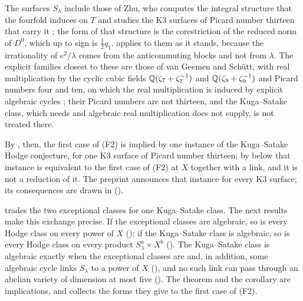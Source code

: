 \begin{remark}
The surfaces $S_{\lambda}$ include those of Zhu, who computes the integral
structure that the fourfold induces on $T$ and studies the K3 surfaces of
Picard number thirteen that carry it \cite{Zhu18}; the form of that structure
is the corestriction of the reduced norm of $D^{0}$, which up to sign is
$\frac12q_{1}$.  applies to them as it stands, because the
irrationality of $e^{2}/\lambda$ comes from the anticommuting blocks and not
from $\lambda$. The explicit families closest to these are those of van
Geemen and Sch\"utt, with
real multiplication by the cyclic cubic fields $\mathbb{Q}(\zeta_{7}+\zeta_{7}^{-1})$
and $\mathbb{Q}(\zeta_{9}+\zeta_{9}^{-1})$ and Picard numbers four and ten, on which
the real multiplication is induced by explicit algebraic cycles
\cite[Theorem~1.2 and Section~4.8]{vGS25}; their Picard numbers are not
thirteen, and the Kuga--Satake class, which  needs and
algebraic real multiplication does not supply, is not treated there.

By , then, the first case of (F2) is implied by one
instance of the Kuga--Satake Hodge conjecture, for one K3 surface of Picard
number thirteen; by  below that instance is
equivalent to the first case of (F2) at $X$ together with a link, and it is
not a reduction of it. The preprint \cite{OAI26c} announces that instance
for every K3 surface; its consequences are drawn in 
().
\end{remark}

 trades the two exceptional classes for one Kuga--Satake
class. The next results make this exchange precise. If the
exceptional classes are algebraic, so is every Hodge class on every power of
$X$ (); if the Kuga--Satake class is algebraic, so is
every Hodge class on every product $S_{\lambda}^{a}\times X^{b}$
(). The Kuga--Satake class is algebraic exactly
when the exceptional classes are and, in addition, some algebraic cycle links
$S_{\lambda}$ to a power of $X$ (), and no such link
can pass through an abelian variety of dimension at most five
(). The theorem and the corollary are
implications, and  collects the forms they give
to the first case of (F2).

